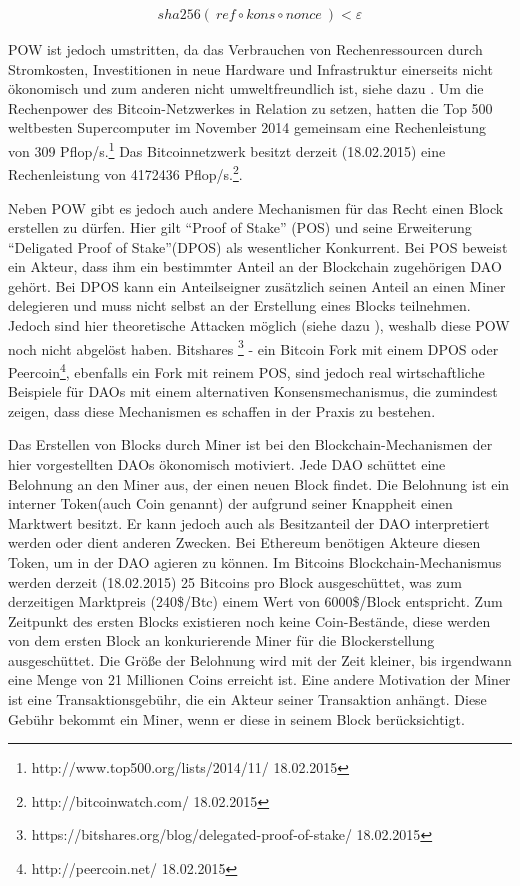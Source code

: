 \documentclass[a4paper,12pt]{report}
\begin{document}
\begin{eqnarray}
   sha256(\ ref\circ kons\circ nonce\ ) < \varepsilon
\end{eqnarray}

POW ist jedoch umstritten, da das Verbrauchen von Rechenressourcen durch Stromkosten, Investitionen in neue Hardware und Infrastruktur einerseits nicht ökonomisch und zum anderen nicht umweltfreundlich ist, siehe dazu \cite{Becker2011a}. Um die Rechenpower des Bitcoin-Netzwerkes in Relation zu setzen, hatten die Top 500 weltbesten Supercomputer im November 2014 gemeinsam eine Rechenleistung von 309 Pflop/s.\footnote{http://www.top500.org/lists/2014/11/ 18.02.2015} Das Bitcoinnetzwerk besitzt derzeit (18.02.2015) eine Rechenleistung von 4172436 Pflop/s.\footnote{http://bitcoinwatch.com/ 18.02.2015}.



Neben POW gibt es jedoch auch andere Mechanismen für das Recht einen Block erstellen zu dürfen. Hier gilt ``Proof of Stake'' (POS) und seine Erweiterung ``Deligated Proof of Stake''(DPOS) als wesentlicher Konkurrent. Bei POS beweist ein Akteur, dass ihm ein bestimmter Anteil an der Blockchain zugehörigen DAO gehört. Bei  DPOS kann ein Anteilseigner zusätzlich seinen Anteil an einen Miner delegieren und muss nicht selbst an der Erstellung eines Blocks teilnehmen. Jedoch sind hier theoretische Attacken möglich (siehe dazu \cite{EthereumBlogPOS} \cite{Vasant2015}), weshalb diese POW noch nicht abgelöst haben. Bitshares \footnote{https://bitshares.org/blog/delegated-proof-of-stake/ 18.02.2015} - ein Bitcoin Fork mit einem DPOS oder Peercoin\footnote{http://peercoin.net/ 18.02.2015}, ebenfalls ein Fork mit reinem POS, sind jedoch real wirtschaftliche Beispiele für DAOs mit einem alternativen Konsensmechanismus, die zumindest zeigen, dass diese Mechanismen es schaffen in der Praxis zu bestehen.

Das Erstellen von Blocks durch Miner ist bei den Blockchain-Mechanismen der hier vorgestellten DAOs ökonomisch motiviert. Jede DAO schüttet eine Belohnung an den Miner aus, der einen neuen Block findet. Die Belohnung ist ein interner Token(auch Coin genannt) der aufgrund seiner Knappheit einen Marktwert besitzt. Er kann jedoch auch als Besitzanteil der DAO interpretiert werden oder dient anderen Zwecken. Bei Ethereum benötigen Akteure diesen Token, um in der DAO agieren zu können. Im Bitcoins Blockchain-Mechanismus werden derzeit (18.02.2015) 25 Bitcoins pro Block ausgeschüttet, was zum derzeitigen Marktpreis (240\$/Btc) einem Wert von 6000\$/Block entspricht.  
Zum Zeitpunkt des ersten Blocks existieren noch keine Coin-Bestände, diese werden von dem ersten Block an konkurierende Miner für die Blockerstellung ausgeschüttet. Die Größe der Belohnung wird mit der Zeit kleiner, bis irgendwann eine Menge von 21 Millionen Coins erreicht ist. Eine andere Motivation der Miner ist eine Transaktionsgebühr, die ein Akteur seiner Transaktion anhängt. Diese Gebühr bekommt ein Miner, wenn er diese in seinem Block berücksichtigt.
\end{document}
